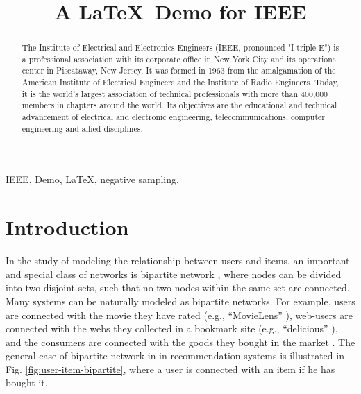 \documentclass[conference]{IEEEtran}
\begin{document}
\title{A \LaTeX\, Demo for IEEE}


\author{
}






\maketitle

\begin{abstract}
The Institute of Electrical and Electronics Engineers (IEEE, pronounced "I triple E") is a professional association with its corporate office in New York City and its operations center in Piscataway, New Jersey. It was formed in 1963 from the amalgamation of the American Institute of Electrical Engineers and the Institute of Radio Engineers. Today, it is the world's largest association of technical professionals with more than 400,000 members in chapters around the world. Its objectives are the educational and technical advancement of electrical and electronic engineering, telecommunications, computer engineering and allied disciplines.
\end{abstract}

\renewcommand\IEEEkeywordsname{Keywords}
\begin{IEEEkeywords}
IEEE, Demo, \LaTeX, negative sampling.
\end{IEEEkeywords}





\IEEEpeerreviewmaketitle



\section{Introduction}


In the study of modeling the relationship between users and items, an important and special class of networks is bipartite network \cite{zhou2007bipartite,de2015bipartite,hu2007co,tang2012user}, where nodes can be divided into two disjoint sets, such that no two nodes within the same set are connected. Many systems can be naturally modeled as bipartite networks. For example, users are connected with the movie they have rated (e.g., ``MovieLens'' \cite{harper2015movielens}), web-users are connected with the webs they collected in a bookmark site (e.g., ``delicious'' \cite{wetzker2008analyzing}), and the consumers are connected with the goods they bought in the market \cite{brijs1999using}. The general case of bipartite network in in recommendation systems is illustrated in Fig. \ref{fig:user-item-bipartite}, where a user is connected with an item if he has bought it.
\end{document}
